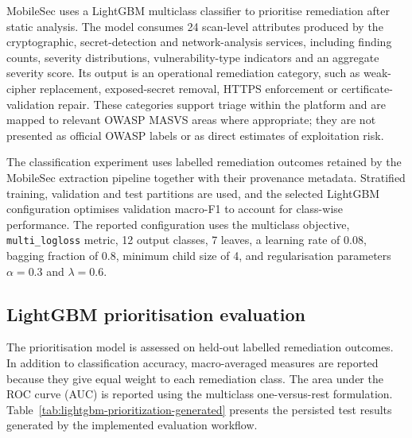 
MobileSec uses a LightGBM multiclass classifier to prioritise remediation
after static analysis. The model consumes 24 scan-level attributes produced by
the cryptographic, secret-detection and network-analysis services, including
finding counts, severity distributions, vulnerability-type indicators and an
aggregate severity score. Its output is an operational remediation category,
such as weak-cipher replacement, exposed-secret removal, HTTPS enforcement or
certificate-validation repair. These categories support triage within the
platform and are mapped to relevant OWASP MASVS areas where appropriate; they
are not presented as official OWASP labels or as direct estimates of
exploitation risk.

The classification experiment uses labelled remediation outcomes retained by
the MobileSec extraction pipeline together with their provenance metadata.
Stratified training, validation and test partitions are used, and the selected
LightGBM configuration optimises validation macro-F1 to account for class-wise
performance. The reported configuration uses the multiclass objective,
\texttt{multi\_logloss} metric, 12 output classes, 7 leaves, a learning rate
of 0.08, bagging fraction of 0.8, minimum child size of 4, and regularisation
parameters $\alpha=0.3$ and $\lambda=0.6$.

\subsection{LightGBM prioritisation evaluation}

The prioritisation model is assessed on held-out labelled remediation
outcomes. In addition to classification accuracy, macro-averaged measures are
reported because they give equal weight to each remediation class. The area
under the ROC curve (AUC) is reported using the multiclass one-versus-rest
formulation. Table~\ref{tab:lightgbm-prioritization-generated} presents the
persisted test results generated by the implemented evaluation workflow.

